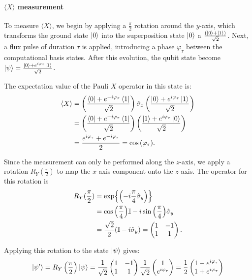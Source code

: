 \paragraph{$\langle X \rangle$ measurement}
To measure $\langle X \rangle$, we begin by applying a $\frac{\pi}{2}$ rotation around the $y$-axis, which transforms the ground state $\ket{0}$ into the superposition state $\ket{0}$ a $\frac{(\ket{0} + \ket{1})}{\sqrt{2}}$.
Next, a flux pulse of duration $\tau$ is applied, introducing a phase $\varphi_\tau$ between the computational basis states. After this evolution, the qubit state become $\ket{\psi}=\frac{\ket{0} + e^{i\varphi_\tau} \ket{1}}{\sqrt{2}}$.

The expectation value of the Pauli $X$ operator in this state is:
\begin{align}
    \langle X \rangle &= \left( \frac{\bra{0} + e^{- i\varphi_\tau} \bra{1}}{\sqrt{2}} \right) \hat{\sigma}_x \left( \frac{\ket{0} + e^{ i \varphi_\tau} \ket{1}}{\sqrt{2}} \right)\\
    &= \left( \frac{\bra{0} + e^{- i \varphi_\tau} \bra{1}}{\sqrt{2}} \right)\left( \frac{\ket{1} + e^{ i \varphi_\tau} \ket{0}}{\sqrt{2}} \right)\\
    &= \frac{e^{ i \varphi_\tau} + e^{- i\varphi_\tau}}{2} = \cos{(\varphi_\tau)}.
\end{align}

Since the measurement can only be performed along the $z$-axis, we apply a rotation $R_Y(\frac{\pi}{2})$ to map the $x$-axis component onto the $z$-axis. The operator for this rotation is
\begin{align}\label{eq:RY90}
    R_Y(\frac{\pi}{2}) &= \exp{\left( -i\frac{\pi}{4}\hat{\sigma}_y\right)}\\
    &= \cos{\left(\frac{\pi}{4}\right)}\mathbb{I} - i\sin{\left(\frac{\pi}{4}\right)}\hat{\sigma}_y\\
    &= \frac{\sqrt{2}}{2}(\mathbb{I} -i\hat{\sigma}_y) = \begin{pmatrix}
        1 & -1 \\
        1 & 1
        \end{pmatrix}.
\end{align}

Applying this rotation to the state $\ket{\psi}$ gives:
\begin{equation}
    \ket{\psi'} = R_Y\left(\frac{\pi}{2}\right) \ket{\psi} = \frac{1}{\sqrt{2}} 
\begin{pmatrix}
1 & -1 \\
1 & 1
\end{pmatrix}
\frac{1}{\sqrt{2}} 
\begin{pmatrix}
1 \\
e^{i\varphi_\tau}
\end{pmatrix}
= \frac{1}{2}
\begin{pmatrix}
1 - e^{i\varphi_\tau} \\
1 + e^{i\varphi_\tau}
\end{pmatrix}
\end{equation}

